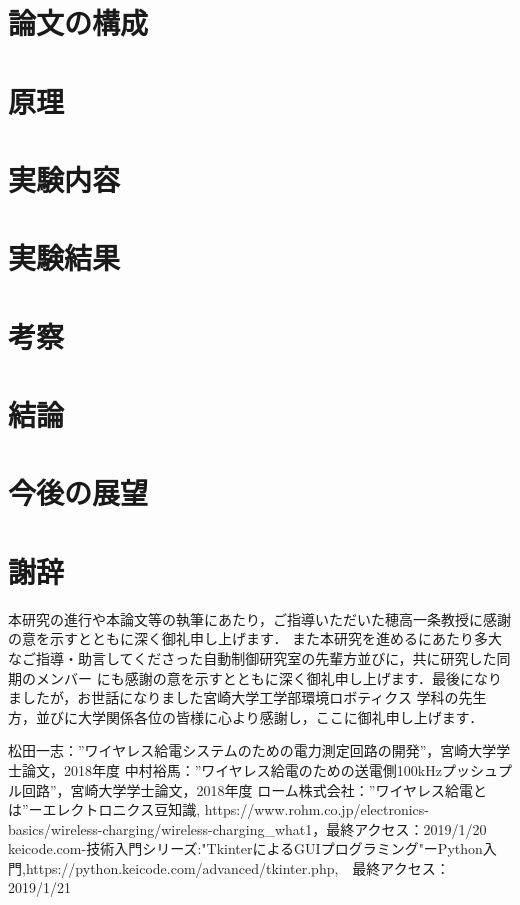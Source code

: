 \documentclass[12pt]{jarticle}
\begin{document}
\section{論文の構成}
\clearpage
\section{原理}

\section{実験内容}

\section{実験結果}

\section{考察}

\section{結論}

\section{今後の展望}

\clearpage
\section{謝辞}
 本研究の進行や本論文等の執筆にあたり，ご指導いただいた穂高一条教授に感謝の意を示すとともに深く御礼申し上げます．
また本研究を進めるにあたり多大なご指導・助言してくださった自動制御研究室の先輩方並びに，共に研究した同期のメンバー
にも感謝の意を示すとともに深く御礼申し上げます．最後になりましたが，お世話になりました宮崎大学工学部環境ロボティクス
学科の先生方，並びに大学関係各位の皆様に心より感謝し，ここに御礼申し上げます．

\begin{thebibliography}{50}
	松田一志：”ワイヤレス給電システムのための電力測定回路の開発”，宮崎大学学士論文，2018年度
	中村裕馬：”ワイヤレス給電のための送電側100kHzプッシュプル回路”，宮崎大学学士論文，2018年度
	  ローム株式会社：”ワイヤレス給電とは”ーエレクトロニクス豆知識, https://www.rohm.co.jp/electronics-basics/wireless-charging/wireless-charging\_what1，最終アクセス：2019/1/20
	keicode.com-技術入門シリーズ:"TkinterによるGUIプログラミング"ーPython入門,https://python.keicode.com/advanced/tkinter.php,　最終アクセス：2019/1/21
\end{thebibliography}
\clearpage
\end{document}
